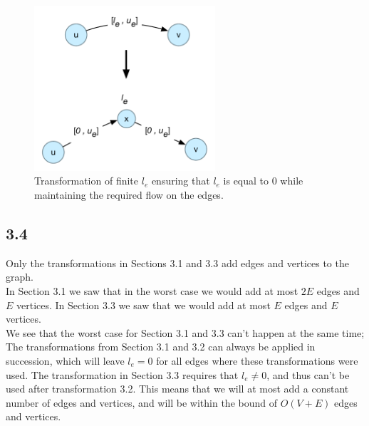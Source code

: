 \documentclass[12pt]{article}
\begin{document}
\begin{figure}[h]
  \centering
    \includegraphics[width=0.6\textwidth]{figures/e3_3}
  \caption{Transformation of finite $l_e$ ensuring that $l_e$ is equal to 0 while maintaining the required flow on the edges.}
  \label{fig:e3_3}
\end{figure}

\subsection*{3.4}
Only the transformations in Sections 3.1 and 3.3 add edges and vertices to the graph.\\
In Section 3.1 we saw that in the worst case we would add at most $2E$ edges and $E$ vertices. In Section 3.3 we saw that we would add at most $E$ edges and $E$ vertices.\\
We see that the worst case for Section 3.1 and 3.3 can't happen at the same time; The transformations from Section 3.1 and 3.2 can always be applied in succession, which will leave $l_e = 0$ for all edges where these transformations were used. The transformation in Section 3.3 requires that $l_e \ne 0$, and thus can't be used after transformation 3.2. This means that we will at most add a constant number of edges and vertices, and will be within the bound of $O(V+E)$ edges and vertices.
\end{document}
